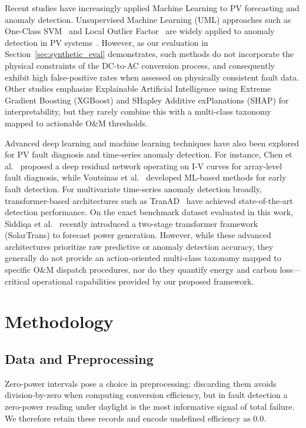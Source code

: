 \documentclass[11pt,a4paper,twoside]{article}
\begin{document}
Recent studies have increasingly applied Machine Learning to PV forecasting and anomaly detection. Unsupervised Machine Learning (UML) approaches such as One-Class SVM~\cite{scholkopf2001} and Local Outlier Factor~\cite{breunig2000} are widely applied to anomaly detection in PV systems~\cite{mellit2022}. However, as our evaluation in Section~\ref{sec:synthetic_eval} demonstrates, such methods do not incorporate the physical constraints of the DC-to-AC conversion process, and consequently exhibit high false-positive rates when assessed on physically consistent fault data. Other studies emphasize Explainable Artificial Intelligence \cite{arrieta2020} using Extreme Gradient Boosting (XGBoost) \cite{chen2016} and SHapley Additive exPlanations (SHAP) \cite{lundberg2017} for interpretability, but they rarely combine this with a multi-class taxonomy mapped to actionable O\&M thresholds.

Advanced deep learning and machine learning techniques have also been explored for PV fault diagnosis and time-series anomaly detection. For instance, Chen et al.~\cite{chenz2019} proposed a deep residual network operating on I-V curves for array-level fault diagnosis, while Voutsinas et al.~\cite{voutsinas2023} developed ML-based methods for early fault detection. For multivariate time-series anomaly detection broadly, transformer-based architectures such as TranAD~\cite{tuli2022} have achieved state-of-the-art detection performance. On the exact benchmark dataset evaluated in this work, Siddiqa et al.~\cite{siddiqa2025} recently introduced a two-stage transformer framework (SolarTrans) to forecast power generation. However, while these advanced architectures prioritize raw predictive or anomaly detection accuracy, they generally do not provide an action-oriented multi-class taxonomy mapped to specific O\&M dispatch procedures, nor do they quantify energy and carbon loss—critical operational capabilities provided by our proposed framework.

\section{Methodology}

\subsection{Data and Preprocessing}
Zero-power intervals pose a choice in preprocessing: discarding them avoids division-by-zero when computing conversion efficiency, but in fault detection a zero-power reading under daylight is the most informative signal of total failure. We therefore retain these records and encode undefined efficiency as 0.0.
\end{document}
